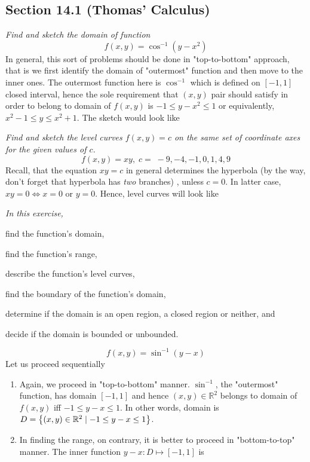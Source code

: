 \documentclass[8pt]{article} %
\begin{document}
\begin{description}
\section{Section 14.1 (Thomas' Calculus)}
	\item[\# 9.]{{\it Find and sketch the domain of function} \[f(x,y)=\cos^{-1}(y-x^2)\]
		In general, this sort of problems should be done in "top-to-bottom" approach, that is we first identify the domain of "outermost"
		function and then move to the inner ones. The outermost function here is $\cos^{-1}$ which is defined on $[-1,1]$ closed interval,
		hence the sole requirement that $(x,y)$ pair should satisfy in order to belong to domain of $f(x,y)$ is $-1\leq y-x^2\leq 1$ or
		equivalently, $x^2-1\leq y\leq x^2+1$. The sketch would look like 
		}
	\item[\# 15.]{{\it Find and sketch the level curves $f(x,y)=c$ on the same set of coordinate axes for the given values of $c$.
		\[f(x,y)=xy,\;c=\;-9,-4,-1,0,1,4,9\]}
		Recall, that the equation $xy=c$ in general determines the hyperbola (by the way, don't forget that hyperbola has \textit{two} branches)
		, unless $c=0$. In latter case, $xy=0\iff x=0\mbox{ or }y=0$. Hence, level curves will look like 
		}
	\item[\# 27.]{{\it In this exercise, \begin{inparaenum}[\bfseries(a)]\item find the function's domain, \item find the function's range,
		\item describe the function's level curves, \item find the boundary of the function's domain, \item determine if the domain is an open
			region, a closed region or neither, and \item decide if the domain is bounded or unbounded.\end{inparaenum}}
			\[f(x,y)=\sin^{-1}(y-x)\]
		Let us proceed sequentially
		\begin{enumerate}[\bfseries(a)]
			\item Again, we proceed in "top-to-bottom" manner. $\sin^{-1}$, the "outermost" function, has domain $[-1,1]$ and hence $(x,y)\in\mathbb{R}^2$
				belongs to domain of $f(x,y)$ iff $-1\leq y-x\leq 1$. In other words, domain is $D=\left\{(x,y)\in\mathbb{R}^2\mid -1\leq y-x\leq 1\right\}$.
			\item In finding the range, on contrary, it is better to proceed in "bottom-to-top" manner. The inner function $y-x:D\mapsto[-1,1]$ is

\end{enumerate}}
\end{description}
\end{document}
